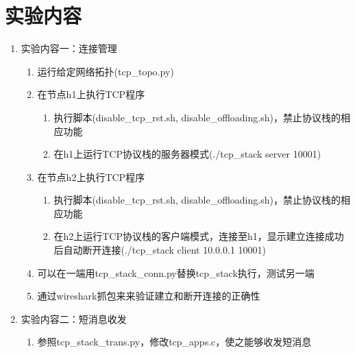 \documentclass[UTF8]{report}
\begin{document}
\pagestyle{fancy}

\maketitle

\section{实验内容}

\begin{enumerate}
    \item 实验内容一：连接管理
    \begin{enumerate}[label=(\arabic*)]
        \item 运行给定网络拓扑(tcp_topo.py)
        \item 在节点h1上执行TCP程序
        \begin{enumerate}
            \item 执行脚本(disable_tcp_rst.sh, disable_offloading.sh)，禁止协议栈的相应功能
            \item 在h1上运行TCP协议栈的服务器模式(./tcp_stack server 10001)
        \end{enumerate}
        \item 在节点h2上执行TCP程序
        \begin{enumerate}
            \item 执行脚本(disable_tcp_rst.sh, disable_offloading.sh)，禁止协议栈的相应功能
            \item 在h2上运行TCP协议栈的客户端模式，连接至h1，显示建立连接成功后自动断开连接(./tcp_stack client 10.0.0.1 10001)
        \end{enumerate}
        \item 可以在一端用tcp_stack_conn.py替换tcp_stack执行，测试另一端
        \item 通过wireshark抓包来来验证建立和断开连接的正确性
    \end{enumerate}
    \item 实验内容二：短消息收发
    \begin{enumerate}[label=(\arabic*)]
        \item 参照tcp_stack_trans.py，修改tcp_apps.c，使之能够收发短消息

\end{enumerate}
\end{enumerate}
\end{document}
